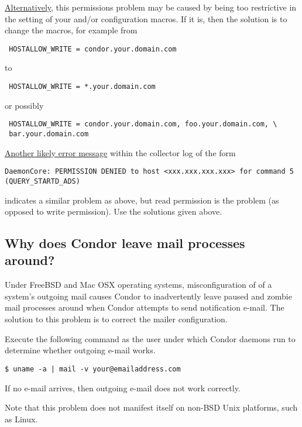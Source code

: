 \underline{Alternatively}, this permissions problem
may be caused by being too restrictive in the setting of
your  and/or
 configuration macros.
If it is, then the solution is to change the macros,
for example from
\begin{verbatim}
 HOSTALLOW_WRITE = condor.your.domain.com
\end{verbatim}
to
\begin{verbatim}
 HOSTALLOW_WRITE = *.your.domain.com
\end{verbatim}
or possibly
\footnotesize
\begin{verbatim}
 HOSTALLOW_WRITE = condor.your.domain.com, foo.your.domain.com, \
 bar.your.domain.com 
\end{verbatim}
\normalsize


\underline{Another likely error message} within the collector log of the form
\footnotesize
\begin{verbatim}
DaemonCore: PERMISSION DENIED to host <xxx.xxx.xxx.xxx> for command 5 (QUERY_STARTD_ADS)
\end{verbatim}
\normalsize
indicates a similar problem as above, but read permission
is the problem (as opposed to write permission).
Use the solutions given above.

\subsection*{Why does Condor leave mail processes around?}

Under FreeBSD and Mac OSX operating systems,
misconfiguration of of a system's outgoing mail causes
Condor to inadvertently leave paused and zombie mail
processes around when Condor attempts to send notification e-mail.
The solution to this problem is
to correct the mailer configuration.

Execute the following command as the user under which Condor
daemons run to determine whether outgoing e-mail works.

\begin{verbatim}
$ uname -a | mail -v your@emailaddress.com
\end{verbatim}

If no e-mail arrives, then outgoing e-mail does not work
correctly.

Note that this problem does not manifest itself
on non-BSD Unix platforms, such as Linux.

